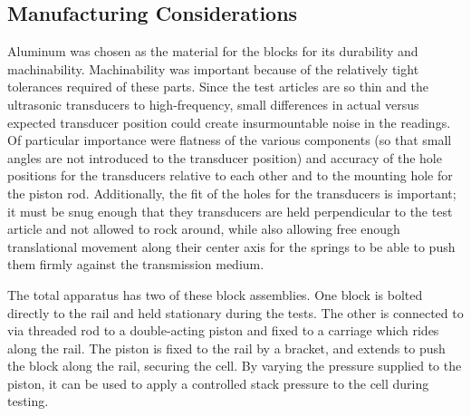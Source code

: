 \subsection{Manufacturing Considerations}
Aluminum was chosen as the material for the blocks for its durability and machinability. Machinability was important because of the relatively tight tolerances required of these parts. Since the test articles are so thin and the ultrasonic transducers to high-frequency, small differences in actual versus expected transducer position could create insurmountable noise in the readings. Of particular importance were flatness of the various components (so that small angles are not introduced to the transducer position) and accuracy of the hole positions for the transducers relative to each other and to the mounting hole for the piston rod. Additionally, the fit of the holes for the transducers is important; it must be snug enough that they transducers are held perpendicular to the test article and not allowed to rock around, while also allowing free enough translational movement along their center axis for the springs to be able to push them firmly against the transmission medium.

The total apparatus has two of these block assemblies. One block is bolted directly to the rail and held stationary during the tests. The other is connected to via threaded rod to a double-acting piston and fixed to a carriage which rides along the rail. The piston is fixed to the rail by a bracket, and extends to push the block along the rail, securing the cell. By varying the pressure supplied to the piston, it can be used to apply a controlled stack pressure to the cell during testing.

